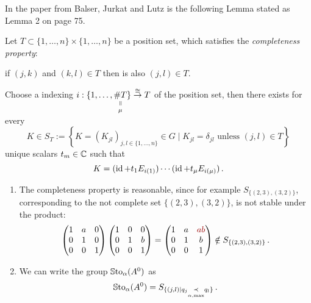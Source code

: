 In the paper \cite{BJL1979Birkhoff} from Balser, Jurkat and Lutz is the
following Lemma stated as Lemma 2 on page 75.
\begin{lem}
  Let $T\subset\{1,\dots,n\}\times\{1,\dots,n\}$ be a position set, which
  satisfies the \emph{completeness property}:
  \begin{einr}
    if $(j,k)$ and $(k,l)\in T$ then is also $(j,l)\in T$.
  \end{einr}
  Choose a indexing $i:\{1,\dots,
  \underset{\mu}{\underset{\text{\rotatebox[origin=c]{-90}{$=$}}}{\#T}}\}
  \overset{\cong}{\to}T$ of the position set, then there exists for every
  \[
    K\in S_T:=\left\{K=(K_{jl})_{j,l\in\{1,\dots,n\}}\in G \mid
      K_{jl}=\delta_{jl} \text{~unless~} (j,l)\in T \right\}
  \]
  unique scalars $t_m\in\mathbb{C}$ such that
  \[
    K=(\operatorname{id} + t_1E_{i(1)})\cdots(\operatorname{id} + t_{\mu}E_{i(\mu)}) \,.
  \]
  \begin{s-rem}
    \begin{enumerate}
      \item The completeness property is reasonable, since for example
        $S_{\{(2,3),(3,2)\}}$, corresponding to the not complete set
        $\{(2,3),(3,2)\}$, is not stable under the product:
        \begin{align*}
          \begin{pmatrix}
            1 & a & 0
          \\0 & 1 & 0
          \\0 & 0 & 1
          \end{pmatrix}
          \begin{pmatrix}
            1 & 0 & 0
          \\0 & 1 & b
          \\0 & 0 & 1
          \end{pmatrix}
          =
          \begin{pmatrix}
            1 & a & \textcolor{red!60!black}{ab}
          \\0 & 1 & b
          \\0 & 0 & 1
          \end{pmatrix}
          \notin S_{\{(2,3),(3,2)\}}
          \,.
        \end{align*}
      \item We can write the group $\operatorname{\mathbb{S}to}_\alpha(A^0)$ as
        \[
          \operatorname{\mathbb{S}to}_\alpha(A^0)=
          S_{\{(j,l)\mid q_j \underset{\alpha,\max}{\prec} q_l\}} \,.
        \]
    \end{enumerate}
  \end{s-rem}
\end{lem}
